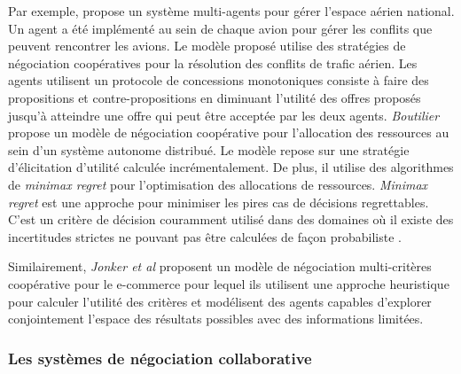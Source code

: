		Par exemple, \cite{wollkind2004automated} propose un système multi-agents pour gérer l'espace aérien national. Un agent a été implémenté au sein de chaque avion pour gérer les conflits que peuvent rencontrer les avions. Le modèle proposé utilise des stratégies de négociation coopératives pour la résolution des conflits de trafic aérien. Les agents utilisent un protocole de concessions monotoniques \cite{zlotkin1989negotiation} consiste à faire des propositions et contre-propositions en diminuant l'utilité des offres proposés jusqu'à atteindre une offre qui peut être acceptée par les deux agents. 
		 \emph{Boutilier} \cite{boutilier2002cooperative} propose un modèle de négociation coopérative pour l'allocation des ressources au sein d'un système autonome distribué. Le modèle repose sur une stratégie d'élicitation d'utilité calculée incrémentalement.  De plus, il utilise des algorithmes de \textit{minimax regret} pour l'optimisation des allocations de ressources. \textit{Minimax regret} est une approche pour minimiser les pires cas de décisions regrettables. C'est un critère de décision couramment utilisé dans des domaines où il existe des incertitudes strictes ne pouvant pas être calculées de façon probabiliste \cite{borodin2005online}.   
	
		Similairement, \emph{Jonker et al} \cite{jonker2007agent} proposent un modèle de négociation multi-critères coopérative pour le e-commerce pour lequel ils utilisent une approche heuristique pour calculer l'utilité des critères et modélisent des agents capables d'explorer conjointement l'espace des résultats possibles avec des informations limitées. 
	
		\subsubsection{Les systèmes de négociation collaborative}
		
